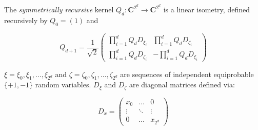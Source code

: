 \documentclass[10pt]{article}
\begin{document}
The \textit{symmetrically recursive} kernel $Q_d:\mathbf{C}^{2^d}\to\mathbf{C}^{2^d}$ is a linear isometry, defined recursively by $Q_0=\left(1\right)$ and

\[
Q_{d+1}=\frac{1}{\sqrt{2}}
\left(
\begin{matrix}
\prod_{i=1}^d Q_d D_{\xi_i}& \prod_{i=1}^d  Q_d D_{\zeta_i}\\
\prod_{i=1}^d Q_d D_{\zeta_i}& -\prod_{i=1}^d  Q_d D_{\xi_i}
\end{matrix}\right)
\]

$\xi=\xi_0,\xi_1,\dots,\xi_{2^d}$ and $\zeta=\zeta_0,\zeta_1,\dots,\zeta_{2^d}$ are sequences of independent equiprobable $\{+1,-1\}$ random variables. $D_{\xi}$ and $D_{\zeta}$ are diagonal matrices defined via:

\[
D_x = \left(
\begin{matrix}
x_0 & \dots & 0 \\
\vdots & \ddots & \vdots \\
0 & \dots & x_{2^d}
\end{matrix}\right)
\]
\end{document}
